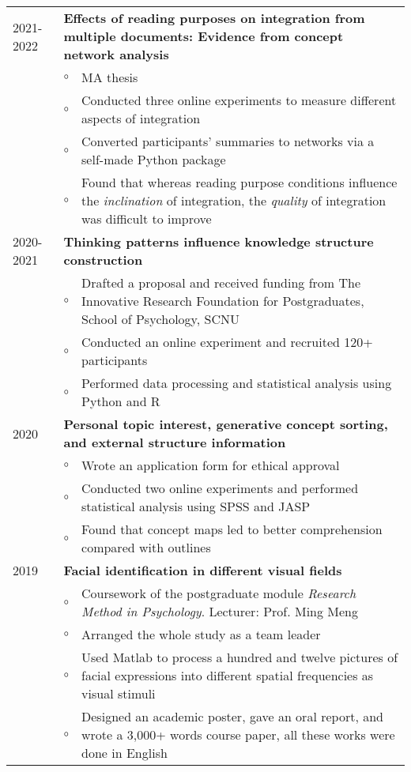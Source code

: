 \documentclass[a4paper, 12pt]{article}
\begin{document}
\begin{tabularx}{\textwidth}{p{2cm} p{0.1cm} X}

    2021-2022 & \multicolumn{2}{X}{\textbf{Effects of reading purposes on integration from multiple documents: Evidence from concept network analysis}} \\
    & $\circ$ & MA thesis \\
    & $\circ$ & Conducted three online experiments to measure different aspects of integration \\
    & $\circ$ & Converted participants' summaries to networks via a self-made Python package\\
    & $\circ$ & Found that whereas reading purpose conditions influence the \textit{inclination} of integration, the \textit{quality} of integration was difficult to improve  \\

    2020-2021 & \multicolumn{2}{X}{\textbf{Thinking patterns influence knowledge structure construction}} \\
    & $\circ$ & Drafted a proposal and received funding from The Innovative Research Foundation for Postgraduates, School of Psychology, SCNU \\
    & $\circ$ & Conducted an online experiment and recruited 120+ participants  \\
    & $\circ$ & Performed data processing and statistical analysis using Python and R \\
    
    2020 & \multicolumn{2}{X}{\textbf{Personal topic interest, generative concept sorting, and external structure information}} \\
    & $\circ$ & Wrote an application form for ethical approval \\
    & $\circ$ & Conducted two online experiments and performed statistical analysis using SPSS and JASP \\
    & $\circ$ & Found that concept maps led to better comprehension compared with outlines \\

    2019 & \multicolumn{2}{X}{\textbf{Facial identification in different visual fields}} \\
    & $\circ$ & Coursework of the postgraduate module \textit{Research Method in Psychology}. Lecturer: Prof. Ming Meng \\ 
    & $\circ$ & Arranged the whole study as a team leader \\
    & $\circ$ & Used Matlab to process a hundred and twelve pictures of facial expressions into different spatial frequencies as visual stimuli \\
    & $\circ$ & Designed an academic poster, gave an oral report, and wrote a 3,000+ words course paper, all these works were done in English \\
    


\end{tabularx}
\end{document}
